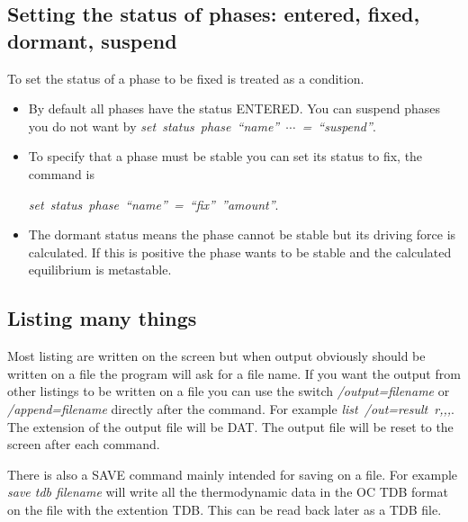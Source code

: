 \documentclass[12pt]{article}
\begin{document}
\subsection{Setting the status of phases: entered, fixed, dormant, suspend}

To set the status of a phase to be fixed is treated as a condition.

\begin{itemize}
\item By default all phases have the status ENTERED.  You can suspend
  phases you do not want by {\em
    set~status~phase~``name''~$\cdots$~=~``suspend''}.

\item To specify that a phase must be stable you can set its status to
  fix, the command is

  {\em set~status~phase~``name''~=~``fix''~''amount''}.

\item The dormant status means the phase cannot be stable but its
  driving force is calculated.  If this is positive the phase wants to
  be stable and the calculated equilibrium is metastable.
\end{itemize}

\subsection{Listing many things}

Most listing are written on the screen but when output obviously
should be written on a file the program will ask for a file name.  If
you want the output from other listings to be written on a file you
can use the switch {\em /output=filename} or {\em /append=filename}
directly after the command.  For example {\em list~/out=result~r,,,}.
The extension of the output file will be DAT.  The output file will be
reset to the screen after each command.

There is also a SAVE command mainly intended for saving on a file.
For example {\em save tdb filename} will write all the thermodynamic
data in the OC TDB format on the file with the extention TDB.  This
can be read back later as a TDB file.
\end{document}

